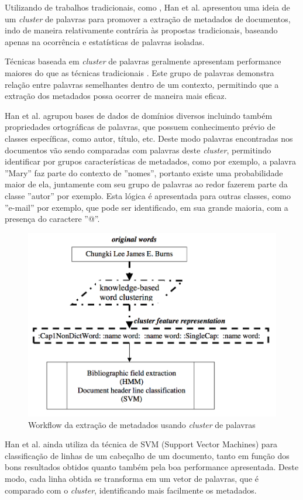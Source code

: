 Utilizando de trabalhos tradicionais, como \cite{Han-SVM}, Han et al. \cite{rule-based} apresentou uma ideia de um \textit{cluster} de palavras para promover a extração de metadados de documentos, indo de maneira relativamente contrária às propostas tradicionais, baseando apenas na ocorrência e estatísticas de palavras isoladas.

Técnicas baseada em \textit{cluster} de palavras geralmente apresentam performance maiores do que as técnicas tradicionais \cite{rule-based}. Este grupo de palavras demonstra relação entre palavras semelhantes dentro de um contexto, permitindo que a extração dos metadados possa ocorrer de maneira mais eficaz.

Han et al. agrupou bases de dados de domínios diversos incluindo também propriedades ortográficas de palavras, que possuem conhecimento prévio de classes específicas, como autor, título, etc. Deste modo palavras encontradas nos documentos vão sendo comparadas com palavras deste \textit{cluster}, permitindo identificar por grupos características de metadados, como por exemplo, a palavra ''Mary'' faz parte do contexto de ''nomes'', portanto existe uma probabilidade maior de ela, juntamente com seu grupo de palavras ao redor fazerem parte da classe ''autor'' por exemplo. Esta lógica é apresentada para outras classes, como ''e-mail'' por exemplo, que pode ser identificado, em sua grande maioria, com a presença do caractere ''@''.

\begin{figure}
\centering
\caption{Workflow da extração de metadados usando \textit{cluster} de palavras}
\label{fig:workflow-rule-based}
\includegraphics[width=0.7\linewidth]{./assets/workflow-rule-based}
\end{figure}

Han et al. ainda utiliza da técnica  de SVM (Support Vector Machines) para classificação de linhas de um cabeçalho de um documento, tanto em função dos bons resultados obtidos quanto também pela boa performance apresentada. Deste modo, cada linha obtida se transforma em um vetor de palavras, que é comparado com o \textit{cluster}, identificando mais facilmente os metadados.

